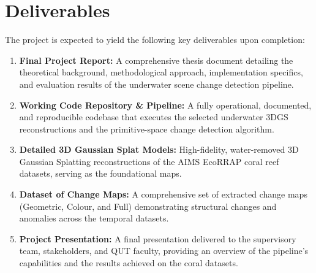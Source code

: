 \chapter{Deliverables}

The project is expected to yield the following key deliverables upon completion:

\begin{enumerate}
    \item \textbf{Final Project Report:} A comprehensive thesis document detailing the theoretical background, methodological approach, implementation specifics, and evaluation results of the underwater scene change detection pipeline.
    \item \textbf{Working Code Repository \& Pipeline:} A fully operational, documented, and reproducible codebase that executes the selected underwater 3DGS reconstructions and the primitive-space change detection algorithm.
    \item \textbf{Detailed 3D Gaussian Splat Models:} High-fidelity, water-removed 3D Gaussian Splatting reconstructions of the AIMS EcoRRAP coral reef datasets, serving as the foundational maps.
    \item \textbf{Dataset of Change Maps:} A comprehensive set of extracted change maps (Geometric, Colour, and Full) demonstrating structural changes and anomalies across the temporal datasets.
    \item \textbf{Project Presentation:} A final presentation delivered to the supervisory team, stakeholders, and QUT faculty, providing an overview of the pipeline's capabilities and the results achieved on the coral datasets.
\end{enumerate}
